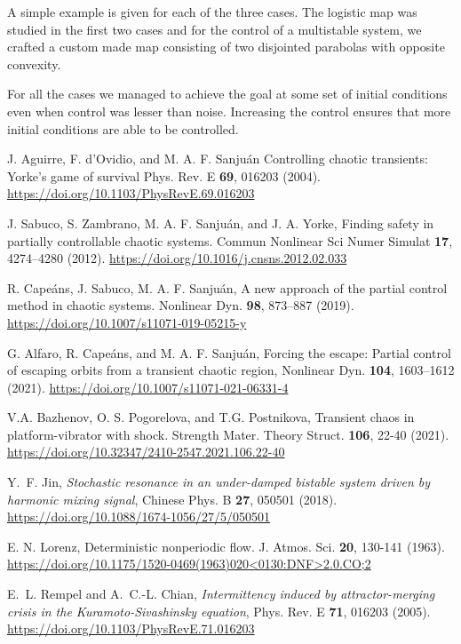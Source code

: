 A simple example is given for each of the three cases. The logistic map was studied in the first two cases and for the control of a multistable system, we crafted a custom made map consisting of two disjointed parabolas with opposite convexity.

For all the cases we managed to achieve the goal at some set of initial conditions even when control was lesser than noise. Increasing the control ensures that more initial conditions are able to be controlled.



\begin{thebibliography}{05}

J. Aguirre, F. d’Ovidio, and M. A. F. Sanjuán
Controlling chaotic transients: Yorke’s game of survival
Phys. Rev. E \textbf{69}, 016203 
(2004).
\url{https://doi.org/10.1103/PhysRevE.69.016203}

J. Sabuco, S. Zambrano, M. A. F. Sanjuán, and J. A. Yorke,
Finding safety in partially controllable chaotic systems.
Commun Nonlinear Sci Numer Simulat \textbf{17}, 4274–4280 
(2012).
\url{https://doi.org/10.1016/j.cnsns.2012.02.033}

R. Capeáns, J. Sabuco, M. A. F. Sanjuán,
A new approach of the partial control method in chaotic
systems.
Nonlinear Dyn. \textbf{98}, 873–887 
(2019). 
\url{https://doi.org/10.1007/s11071-019-05215-y}

G. Alfaro, R. Capeáns, and M. A. F. Sanjuán,
Forcing the escape: Partial control of escaping orbits from a
transient chaotic region,
Nonlinear Dyn. \textbf{104}, 1603--1612 (2021).
\url{https://doi.org/10.1007/s11071-021-06331-4}

V.A. Bazhenov, O. S. Pogorelova, and T.G. Postnikova,
Transient chaos in platform-vibrator with shock.
Strength Mater. Theory Struct. \textbf{106}, 22-40 
(2021).
\url{https://doi.org/10.32347/2410-2547.2021.106.22-40}

Y.~F. Jin,
{\em Stochastic resonance in an under-damped bistable system driven by harmonic mixing signal}, 
Chinese Phys. B \textbf{27}, 050501 
(2018).
\url{https://doi.org/10.1088/1674-1056/27/5/050501}

E. N. Lorenz,
Deterministic nonperiodic flow.
J. Atmos. Sci. \textbf{20}, 130-141 
(1963).
\url{https://doi.org/10.1175/1520-0469(1963)020<0130:DNF>2.0.CO;2}


E.~L. Rempel and A.~C.-L. Chian, 
{\em Intermittency induced by attractor-merging crisis in the Kuramoto-Sivashinsky equation}, 
Phys. Rev. E \textbf{71}, 016203 
(2005).
\url{https://doi.org/10.1103/PhysRevE.71.016203}


\end{thebibliography}
